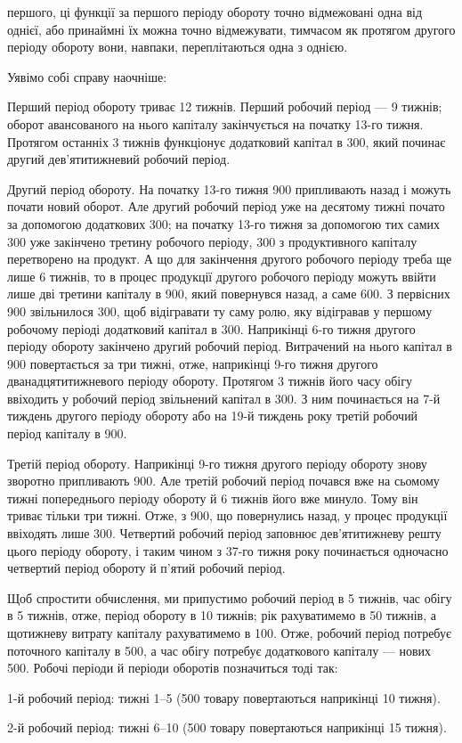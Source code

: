 \parcont{}  %
першого, ці функції за першого періоду обороту точно відмежовані одна
від однієї, або принаймні їх можна точно відмежувати, тимчасом як протягом
другого періоду обороту вони, навпаки, переплітаються одна з
однією.

Уявімо собі справу наочніше:

Перший період обороту триває 12 тижнів. Перший робочий період —
9 тижнів; оборот авансованого на нього капіталу закінчується на початку
13-го тижня. Протягом останніх 3 тижнів функціонує додатковий капітал
в 300, який починає другий дев’ятитижневий робочий
період.

Другий період обороту. На початку 13-го тижня 900 припливають
назад і можуть почати новий оборот. Але другий робочий
період уже на десятому тижні почато за допомогою додаткових 300; на початку 13-го тижня за допомогою тих самих 300
уже закінчено третину робочого періоду, 300 з продуктивного
капіталу перетворено на продукт. А що для закінчення другого робочого
періоду треба ще лише 6 тижнів, то в процес продукції другого робочого
періоду можуть ввійти лише дві третини капіталу в 900,
який повернувся назад, а саме 600. З первісних 900
звільнилося 300, щоб відігравати ту саму ролю, яку відігравав
у першому робочому періоді додатковий капітал в 300. Наприкінці
6-го тижня другого періоду обороту закінчено другий робочий
період. Витрачений на нього капітал в 900 повертається за три
тижні, отже, наприкінці 9-го тижня другого дванадцятитижневого періоду
обороту. Протягом 3 тижнів його часу обігу ввіходить у робочий період
звільнений капітал в 300. З ним починається на 7-й тиждень
другого періоду обороту або на 19-й тиждень року третій робочий
період капіталу в 900.

Третій період обороту. Наприкінці 9-го тижня другого періоду обороту
знову зворотно припливають 900. Але третій робочий
період почався вже на сьомому тижні попереднього періоду обороту й
6 тижнів його вже минуло. Тому він триває тільки три тижні. Отже,
з 900, що повернулись назад, у процес продукції ввіходять
лише 300. Четвертий робочий період заповнює дев’ятитижневу
решту цього періоду обороту, і таким чином з 37-го тижня року починається
одночасно четвертий період обороту й п’ятий робочий період.

Щоб спростити обчислення, ми припустимо робочий період в 5 тижнів,
час обігу в 5 тижнів, отже, період обороту в 10 тижнів; рік рахуватимемо
в 50 тижнів, а щотижневу витрату капіталу рахуватимемо в 100. Отже, робочий період потребує поточного капіталу в 500,
а час обігу потребує додаткового капіталу — нових 500. Робочі
періоди й періоди оборотів позначиться тоді так:

1-й робочий період: тижні 1--5 (500 товару повертаються
наприкінці 10 тижня).

2-й робочий період: тижні 6--10 (500 товару повертаються
наприкінці 15 тижня).
